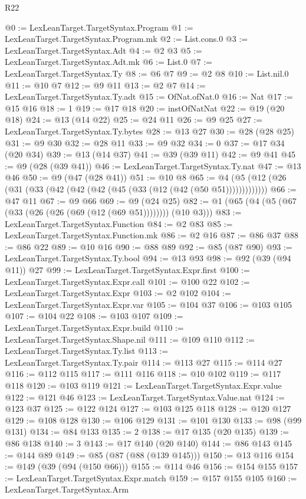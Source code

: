 \begin{lexlean}{R22}
\begin{coremodule}
{{{{{{{{{{{{{{{{{{{{{{{{{{{{{{{{{{{{{{{{{{{{{{{{{{{{@0 := LexLeanTarget.TargetSyntax.Program
@1 := LexLeanTarget.TargetSyntax.Program.mk
@2 := List.cons.{0}
@3 := LexLeanTarget.TargetSyntax.Adt
@4 := @2 @3
@5 := LexLeanTarget.TargetSyntax.Adt.mk
@6 := List.{0}
@7 := LexLeanTarget.TargetSyntax.Ty
@8 := @6 @7
@9 := @2 @8
@10 := List.nil.{0}
@11 := @10 @7
@12 := @9 @11
@13 := @2 @7
@14 := LexLeanTarget.TargetSyntax.Ty.adt
@15 := OfNat.ofNat.{0}
@16 := Nat
@17 := @15 @16
@18 := 1
@19 := @17 @18
@20 := instOfNatNat
@22 := @19 (@20 @18)
@24 := @13 (@14 @22)
@25 := @24 @11
@26 := @9 @25
@27 := LexLeanTarget.TargetSyntax.Ty.bytes
@28 := @13 @27
@30 := @28 (@28 @25)
@31 := @9 @30
@32 := @28 @11
@33 := @9 @32
@34 := 0
@37 := @17 @34 (@20 @34)
@39 := @13 (@14 @37)
@41 := @39 (@39 @11)
@42 := @9 @41
@45 := @9 (@28 (@39 @41))
@46 := LexLeanTarget.TargetSyntax.Ty.nat
@47 := @13 @46
@50 := @9 (@47 (@28 @41))
@51 := @10 @8
@65 := @4 (@5 (@12 (@26 (@31 (@33 (@42 (@42 (@42 (@45 (@33 (@12 (@42 (@50 @51)))))))))))))
@66 := @47 @11
@67 := @9 @66
@69 := @9 (@24 @25)
@82 := @1 (@65 (@4 (@5 (@67 (@33 (@26 (@26 (@69 (@12 (@69 @51)))))))) (@10 @3)))
@83 := LexLeanTarget.TargetSyntax.Function
@84 := @2 @83
@85 := LexLeanTarget.TargetSyntax.Function.mk
@86 := @2 @16
@87 := @86 @37
@88 := @86 @22
@89 := @10 @16
@90 := @88 @89
@92 := @85 (@87 @90)
@93 := LexLeanTarget.TargetSyntax.Ty.bool
@94 := @13 @93
@98 := @92 (@39 (@94 @11)) @27
@99 := LexLeanTarget.TargetSyntax.Expr.first
@100 := LexLeanTarget.TargetSyntax.Expr.call
@101 := @100 @22
@102 := LexLeanTarget.TargetSyntax.Expr
@103 := @2 @102
@104 := LexLeanTarget.TargetSyntax.Expr.var
@105 := @104 @37
@106 := @103 @105
@107 := @104 @22
@108 := @103 @107
@109 := LexLeanTarget.TargetSyntax.Expr.build
@110 := LexLeanTarget.TargetSyntax.Shape.nil
@111 := @109 @110
@112 := LexLeanTarget.TargetSyntax.Ty.list
@113 := LexLeanTarget.TargetSyntax.Ty.pair
@114 := @113 @27
@115 := @114 @27
@116 := @112 @115
@117 := @111 @116
@118 := @10 @102
@119 := @117 @118
@120 := @103 @119
@121 := LexLeanTarget.TargetSyntax.Expr.value
@122 := @121 @46
@123 := LexLeanTarget.TargetSyntax.Value.nat
@124 := @123 @37
@125 := @122 @124
@127 := @103 @125 @118
@128 := @120 @127
@129 := @108 @128
@130 := @106 @129
@131 := @101 @130
@133 := @98 (@99 @131)
@134 := @84 @133
@135 := 2
@138 := @17 @135 (@20 @135)
@139 := @86 @138
@140 := 3
@143 := @17 @140 (@20 @140)
@144 := @86 @143
@145 := @144 @89
@149 := @85 (@87 (@88 (@139 @145)))
@150 := @13 @116
@154 := @149 (@39 (@94 (@150 @66)))
@155 := @114 @46
@156 := @154 @155
@157 := LexLeanTarget.TargetSyntax.Expr.match
@159 := @157 @155 @105
@160 := LexLeanTarget.TargetSyntax.Arm
}}}}}}}}}}}}}}}}}}}}}}}}}}}}}}}}}}}}}}}}}}}}}}}}}}}}
\end{coremodule}
\end{lexlean}
